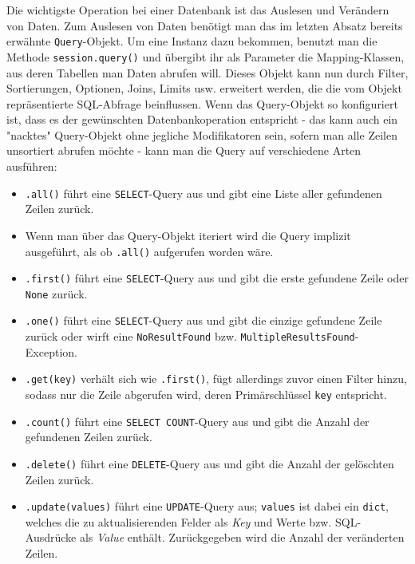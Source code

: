 Die wichtigste Operation bei einer Datenbank ist das Auslesen und Verändern von
Daten. Zum Auslesen von Daten benötigt man das im letzten Absatz bereits erwähnte
\texttt{Query}-Objekt. Um eine Instanz dazu bekommen, benutzt man die Methode
\texttt{session.query()} und übergibt ihr als Parameter die Mapping-Klassen, aus
deren Tabellen man Daten abrufen will. Dieses Objekt kann nun durch Filter,
Sortierungen, Optionen, Joins, Limits usw. erweitert werden, die die vom Objekt
repräsentierte SQL-Abfrage beinflussen. Wenn das Query-Objekt so konfiguriert
ist, dass es der gewünschten Datenbankoperation entspricht - das kann auch ein
"nacktes" Query-Objekt ohne jegliche Modifikatoren sein, sofern man alle Zeilen
unsortiert abrufen möchte - kann man die Query auf verschiedene Arten ausführen:
\begin{itemize}
\item \texttt{.all()} führt eine \texttt{SELECT}-Query aus und gibt eine Liste
aller gefundenen Zeilen zurück.

\item Wenn man über das Query-Objekt iteriert wird die Query implizit
ausgeführt, als ob \texttt{.all()} aufgerufen worden wäre.

\item \texttt{.first()} führt eine \texttt{SELECT}-Query aus und gibt die erste
gefundene Zeile oder \texttt{None} zurück.

\item \texttt{.one()} führt eine \texttt{SELECT}-Query aus und gibt die einzige
gefundene Zeile zurück oder wirft eine \texttt{NoResultFound} bzw.
\texttt{MultipleResultsFound}-Exception.

\item \texttt{.get(key)} verhält sich wie \texttt{.first()}, fügt allerdings
zuvor einen Filter hinzu, sodass nur die Zeile abgerufen wird, deren
Primärschlüssel \texttt{key} entspricht.

\item \texttt{.count()} führt eine \texttt{SELECT COUNT}-Query aus und gibt die
Anzahl der gefundenen Zeilen zurück.

\item \texttt{.delete()} führt eine \texttt{DELETE}-Query aus und gibt die
Anzahl der gelöschten Zeilen zurück.

\item \texttt{.update(values)} führt eine \texttt{UPDATE}-Query aus;
\texttt{values} ist dabei ein \texttt{dict}, welches die zu aktualisierenden
Felder als \emph{Key} und Werte bzw. SQL-Ausdrücke als \emph{Value} enthält.
Zurückgegeben wird die Anzahl der veränderten Zeilen.
\end{itemize}


